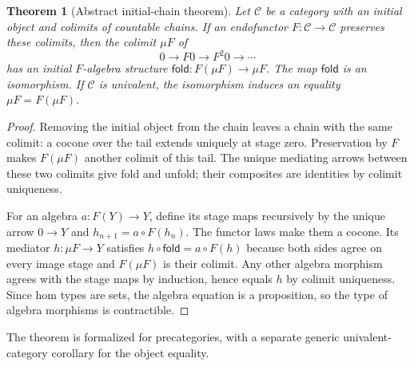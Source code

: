 \documentclass[11pt,a4paper]{article}
\newtheorem{theorem}{Theorem}[section]
\theoremstyle{definition}
\theoremstyle{remark}
\begin{document}
\begin{theorem}[Abstract initial-chain theorem]\label{thm:initial-chain}
Let $\mathcal C$ be a category with an initial object and colimits of
countable chains. If an endofunctor $F:\mathcal C\to\mathcal C$ preserves
these colimits, then the colimit $\mu F$ of
\[
 0\longrightarrow F0\longrightarrow F^2 0\longrightarrow\cdots
\]
has an initial $F$-algebra structure
$\mathsf{fold}:F(\mu F)\to\mu F$. The map $\mathsf{fold}$ is an
isomorphism. If $\mathcal C$ is univalent, the isomorphism induces an
equality $\mu F=F(\mu F)$.
\end{theorem}
\begin{proof}
Removing the initial object from the chain leaves a chain with the same
colimit: a cocone over the tail extends uniquely at stage zero. Preservation
by $F$ makes $F(\mu F)$ another colimit of this tail. The unique mediating
arrows between these two colimits give fold and unfold; their composites
are identities by colimit uniqueness.

For an algebra $a:F(Y)\to Y$, define its stage maps recursively by the
unique arrow $0\to Y$ and $h_{n+1}=a\circ F(h_n)$. The functor laws make
them a cocone. Its mediator $h:\mu F\to Y$ satisfies
$h\circ\mathsf{fold}=a\circ F(h)$ because both sides agree on every
image stage and $F(\mu F)$ is their colimit. Any other algebra morphism
agrees with the stage maps by induction, hence equals $h$ by colimit
uniqueness. Since hom types are sets, the algebra equation is a
proposition, so the type of algebra morphisms is contractible.
\end{proof}

The theorem is formalized for precategories, with a separate generic
univalent-category corollary for the object equality.
\end{document}
